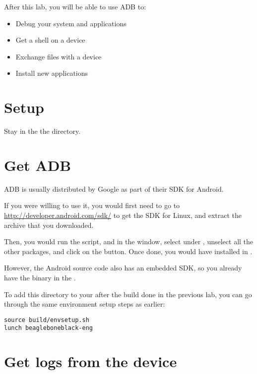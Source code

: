 
After this lab, you will be able to use ADB to:
\begin{itemize}
  \item Debug your system and applications
  \item Get a shell on a device
  \item Exchange files with a device
  \item Install new applications
\end{itemize}

\section{Setup}

Stay in the the  directory.

\section{Get ADB}

ADB is usually distributed by Google as part of their SDK for Android.

If you were willing to use it, you would first need to go to
\url{http://developer.android.com/sdk/} to get the SDK for Linux, and
extract the archive that you downloaded.

Then, you would run the  script, and in the
 window, select  under
, unselect all the other packages, and click on the
 button.  Once done, you would have
 installed in .

However, the Android source code also has an embedded SDK, so you
already have the  binary in the
.

To add this directory to your  after the build done in the
previous lab, you can go through the same environment setup steps as
earlier:

\begin{verbatim}
source build/envsetup.sh
lunch beagleboneblack-eng
\end{verbatim}

\section{Get logs from the device}


